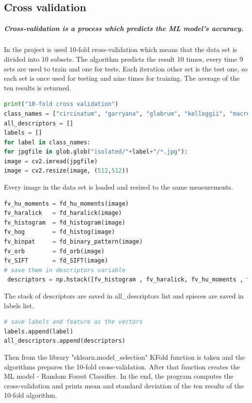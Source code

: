 \documentclass[12pt]{article}
\begin{document}
\newpage

\subsection{Cross validation}

\subparagraph{Cross-validation is a process which predicts the ML model's accuracy.}

In the project is used 10-fold cross-validation which means that the data set is divided into 10 subsets. The algorithm predicts the result 10 times, every time 9 sets are used to train and one for tests. Each iteration other set is the test one, so each set is once used for testing and nine times for training. The average of the ten results is returned.

\begin{lstlisting}[language=Python]
print("10-fold cross validation")
class_names = ["circinatum", "garryana", "glabrum", "kelloggii", "macrophyllum","negundo"]
all_descriptors = []
labels = []
for label in class_names:
for jpgfile in glob.glob("isolated/"+label+"/*.jpg"):
image = cv2.imread(jpgfile)
image = cv2.resize(image, (512,512))
\end{lstlisting}

Every image in the data set is loaded and resized to the same measurements.

\begin{lstlisting}[language=Python]
fv_hu_moments = fd_hu_moments(image)
fv_haralick   = fd_haralick(image)
fv_histogram  = fd_histogram(image)
fv_hog        = fd_histog(image)
fv_binpat     = fd_binary_pattern(image)
fv_orb        = fd_orb(image)
fv_SIFT       = fd_SIFT(image)
# save them in descriptors variable
 descriptors = np.hstack([fv_histogram , fv_haralick, fv_hu_moments , fv_hog , fv_binpat, fv_orb])
\end{lstlisting}

The stack of descriptors are saved in all\_descriptors list and spieces are saved in labels list.

\begin{lstlisting}[language=Python]
# save labels and feature as the vectors
labels.append(label)
all_descriptors.append(descriptors)
\end{lstlisting}

Then from the library "sklearn.model\_selection" KFold function is taken and the algorithms prepares the 10-fold cross-validation.
After that function creates the ML model - Random Forest Classifier. In the end, the program computes the cross-validation and prints mean and standard deviation of the ten results of the 10-fold algorithm.
\end{document}
